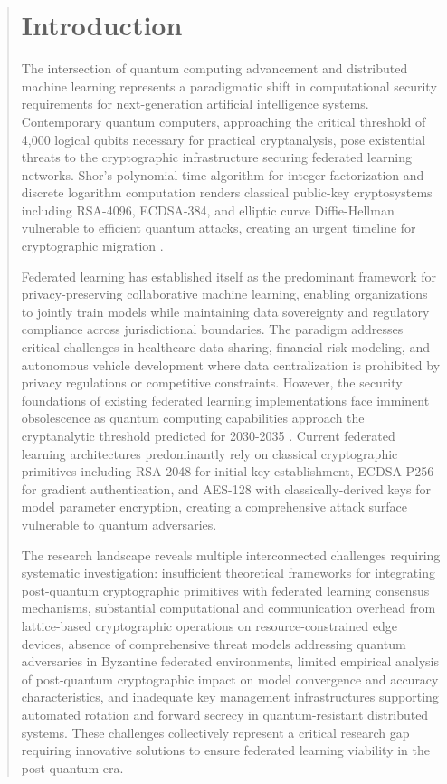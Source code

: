 \documentclass{svproc}
\begin{document}
\begin{abstract}
\section{Introduction}
\label{sec:intro}

The intersection of quantum computing advancement and distributed machine learning represents a paradigmatic shift in computational security requirements for next-generation artificial intelligence systems. Contemporary quantum computers, approaching the critical threshold of 4,000 logical qubits necessary for practical cryptanalysis, pose existential threats to the cryptographic infrastructure securing federated learning networks. Shor's polynomial-time algorithm for integer factorization and discrete logarithm computation renders classical public-key cryptosystems including RSA-4096, ECDSA-384, and elliptic curve Diffie-Hellman vulnerable to efficient quantum attacks, creating an urgent timeline for cryptographic migration \cite{amrita_quantum_2023, chen_quantum_2023}.

Federated learning has established itself as the predominant framework for privacy-preserving collaborative machine learning, enabling organizations to jointly train models while maintaining data sovereignty and regulatory compliance across jurisdictional boundaries. The paradigm addresses critical challenges in healthcare data sharing, financial risk modeling, and autonomous vehicle development where data centralization is prohibited by privacy regulations or competitive constraints. However, the security foundations of existing federated learning implementations face imminent obsolescence as quantum computing capabilities approach the cryptanalytic threshold predicted for 2030-2035 \cite{mcmahan_federated_2023}. Current federated learning architectures predominantly rely on classical cryptographic primitives including RSA-2048 for initial key establishment, ECDSA-P256 for gradient authentication, and AES-128 with classically-derived keys for model parameter encryption, creating a comprehensive attack surface vulnerable to quantum adversaries.

The research landscape reveals multiple interconnected challenges requiring systematic investigation: insufficient theoretical frameworks for integrating post-quantum cryptographic primitives with federated learning consensus mechanisms, substantial computational and communication overhead from lattice-based cryptographic operations on resource-constrained edge devices, absence of comprehensive threat models addressing quantum adversaries in Byzantine federated environments, limited empirical analysis of post-quantum cryptographic impact on model convergence and accuracy characteristics, and inadequate key management infrastructures supporting automated rotation and forward secrecy in quantum-resistant distributed systems. These challenges collectively represent a critical research gap requiring innovative solutions to ensure federated learning viability in the post-quantum era.


\end{abstract}
\end{document}
